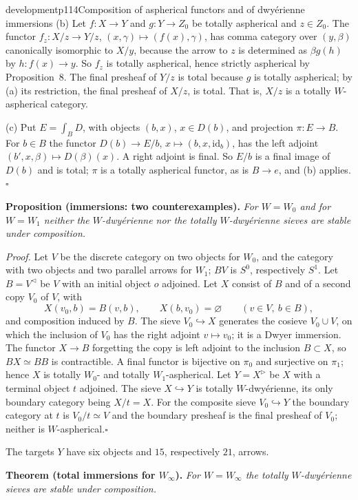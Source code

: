 \begin{dcomment}{development}{p114}{Composition of aspherical functors and of dwy\'erienne immersions}
(b) Let $f:X\to Y$ and $g:Y\to Z_0$ be totally aspherical and $z\in Z_0$. The functor $f_z:X/z\to Y/z$, $(x,\gamma)\mapsto(f(x),\gamma)$, has comma category over $(y,\beta)$ canonically isomorphic to $X/y$, because the arrow to $z$ is determined as $\beta g(h)$ by $h:f(x)\to y$. So $f_z$ is totally aspherical, hence strictly aspherical by Proposition~8. The final presheaf of $Y/z$ is total because $g$ is totally aspherical; by (a) its restriction, the final presheaf of $X/z$, is total. That is, $X/z$ is a totally $W$-aspherical category.

(c) Put $E=\int_BD$, with objects $(b,x)$, $x\in D(b)$, and projection $\pi:E\to B$. For $b\in B$ the functor $D(b)\to E/b$, $x\mapsto(b,x,\mathrm{id}_b)$, has the left adjoint $(b',x,\beta)\mapsto D(\beta)(x)$. A right adjoint is final. So $E/b$ is a final image of $D(b)$ and is total; $\pi$ is a totally aspherical functor, as is $B\to e$, and (b) applies.\hfill$\square$

\textbf{Proposition (immersions: two counterexamples).}\ours
\textit{For $W=W_0$ and for $W=W_1$ neither the $W$-dwy\'erienne nor the totally $W$-dwy\'erienne sieves are stable under composition.}

\textit{Proof.}
Let $V$ be the discrete category on two objects for $W_0$, and the category with two objects and two parallel arrows for $W_1$; $BV$ is $S^0$, respectively $S^1$. Let $B=V^{\triangleleft}$ be $V$ with an initial object $o$ adjoined. Let $X$ consist of $B$ and of a second copy $V_0$ of $V$, with
\[
 X(v_0,b)=B(v,b),\qquad X(b,v_0)=\varnothing\qquad(v\in V,\ b\in B),
\]
and composition induced by $B$. The sieve $V_0\hookrightarrow X$ generates the cosieve $V_0\cup V$, on which the inclusion of $V_0$ has the right adjoint $v\mapsto v_0$; it is a Dwyer immersion. The functor $X\to B$ forgetting the copy is left adjoint to the inclusion $B\subset X$, so $BX\simeq BB$ is contractible. A final functor is bijective on $\pi_0$ and surjective on $\pi_1$; hence $X$ is totally $W_0$- and totally $W_1$-aspherical. Let $Y=X^{\triangleright}$ be $X$ with a terminal object $t$ adjoined. The sieve $X\hookrightarrow Y$ is totally $W$-dwy\'erienne, its only boundary category being $X/t=X$. For the composite sieve $V_0\hookrightarrow Y$ the boundary category at $t$ is $V_0/t\simeq V$ and the boundary presheaf is the final presheaf of $V_0$; neither is $W$-aspherical.\hfill$\square$

The targets $Y$ have six objects and $15$, respectively $21$, arrows.

\textbf{Theorem (total immersions for $W_\infty$).}\ours
\textit{For $W=W_\infty$ the totally $W$-dwy\'erienne sieves are stable under composition.}


\end{dcomment}

